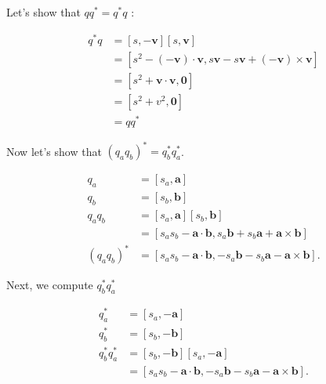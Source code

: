 Let's show that $q q^{*}=q^{*} q$ :

$$
    \begin{aligned}
        q^{*} q & =[s,-\mathbf{v}][s, \mathbf{v}]                                                                               \\
                & =\left[s^{2}-(-\mathbf{v}) \cdot \mathbf{v}, s \mathbf{v}-s \mathbf{v}+(-\mathbf{v}) \times \mathbf{v}\right] \\
                & =\left[s^{2}+\mathbf{v} \cdot \mathbf{v}, \mathbf{0}\right]                                                   \\
                & =\left[s^{2}+v^{2}, \mathbf{0}\right]                                                                         \\
                & =q q^{*}
    \end{aligned}
$$

Now let's show that $\left(q_{a} q_{b}\right)^{*}=q_{b}^{*} q_{a}^{*}$.

$$
    \begin{aligned}
        q_{a}                        & =\left[s_{a}, \mathbf{a}\right]                                                                                         \\
        q_{b}                        & =\left[s_{b}, \mathbf{b}\right]                                                                                         \\
        q_{a} q_{b}                  & =\left[s_{a}, \mathbf{a}\right]\left[s_{b}, \mathbf{b}\right]                                                           \\
                                     & =\left[s_{a} s_{b}-\mathbf{a} \cdot \mathbf{b}, s_{a} \mathbf{b}+s_{b} \mathbf{a}+\mathbf{a} \times \mathbf{b}\right]   \\
        \left(q_{a} q_{b}\right)^{*} & =\left[s_{a} s_{b}-\mathbf{a} \cdot \mathbf{b},-s_{a} \mathbf{b}-s_{b} \mathbf{a}-\mathbf{a} \times \mathbf{b}\right] .
    \end{aligned}
$$

Next, we compute $q_{b}^{*} q_{a}^{*}$

$$
    \begin{aligned}
        q_{a}^{*}           & =\left[s_{a},-\mathbf{a}\right]                                                                                         \\
        q_{b}^{*}           & =\left[s_{b},-\mathbf{b}\right]                                                                                         \\
        q_{b}^{*} q_{a}^{*} & =\left[s_{b},-\mathbf{b}\right]\left[s_{a},-\mathbf{a}\right]                                                           \\
                            & =\left[s_{a} s_{b}-\mathbf{a} \cdot \mathbf{b},-s_{a} \mathbf{b}-s_{b} \mathbf{a}-\mathbf{a} \times \mathbf{b}\right] .
    \end{aligned}
$$

